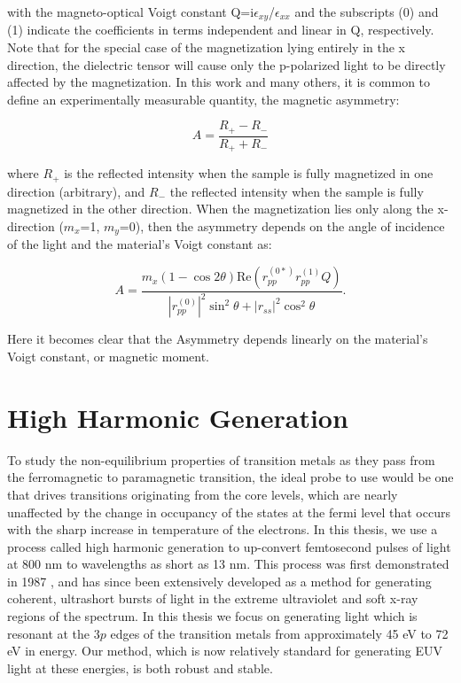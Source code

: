 with the magneto-optical Voigt constant Q=i$\epsilon_{xy}$/$\epsilon_{xx}$ and the subscripts (0) and (1) indicate the coefficients in terms independent and linear in Q, respectively. Note that for the special case of the magnetization lying entirely in the x direction, the dielectric tensor will cause only the p-polarized light to be directly affected by the magnetization. In this work and many others, it is common to define an experimentally measurable quantity, the magnetic asymmetry:

\begin{equation}
A=\frac{R_+ - R_-}{R_+ + R_-}
\end{equation}

where $R_+$ is the reflected intensity when the sample is fully magnetized in one direction (arbitrary), and $R_-$ the reflected intensity when the sample is fully magnetized in the other direction. When the magnetization lies only along the x-direction ($m_x$=1, $m_y$=0), then the asymmetry depends on the angle of incidence of the light and the material's Voigt constant as:

\begin{equation}
A = \frac{m_x(1-\cos{2\theta})\text{Re}(r_{pp}^{(0*)}r_{pp}^{(1)}Q)}{|r_{pp}^{(0)}|^2\sin^2{\theta}+|r_{ss}|^2\cos^2{\theta}}.
\end{equation}

Here it becomes clear that the Asymmetry depends linearly on the material's Voigt constant, or magnetic moment.

\section{High Harmonic Generation}

To study the non-equilibrium  properties of transition metals as they pass from the ferromagnetic to paramagnetic transition, the ideal probe to use would be one that drives transitions originating from the core levels, which are nearly unaffected by the change in occupancy of the states at the fermi level that occurs with the sharp increase in temperature of the electrons. In this thesis, we use a process called high harmonic generation to up-convert femtosecond pulses of light at 800 nm to wavelengths as short as 13 nm. This process was first demonstrated in 1987 \cite{McPherson1987,Manus2002}, and has since been extensively developed \cite{J.J.MacklinJ.D.Kmetec1993,LHuillier1993} as a method for generating coherent, ultrashort bursts of light in the extreme ultraviolet and soft x-ray regions of the spectrum. In this thesis we focus on generating light which is resonant at the $3p$ edges of the transition metals from approximately 45 eV to 72 eV in energy. Our method, which is now relatively standard for generating EUV light at these energies, is both robust and stable.

